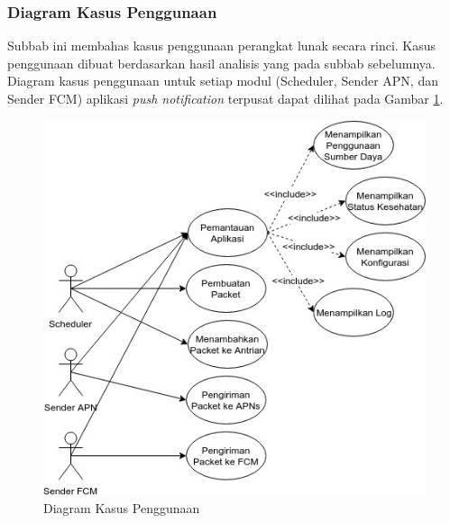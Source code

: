 \subsubsection{Diagram Kasus Penggunaan}
\par Subbab ini membahas kasus penggunaan perangkat lunak secara rinci. Kasus penggunaan dibuat berdasarkan hasil analisis yang pada subbab sebelumnya. Diagram kasus penggunaan untuk setiap modul (Scheduler, Sender APN, dan Sender FCM) aplikasi \textit{push notification} terpusat dapat dilihat pada Gambar \ref{diagram_kasus_penggunaan}.
\begin{figure}[H]
	\caption{Diagram Kasus Penggunaan} \label{diagram_kasus_penggunaan}
    \includegraphics[width=1\textwidth]{bab3/figures/diagram_kasus_penggunaan.jpg}
\end{figure}

\newcommand\tableUcDesc[8] {
\begin{longtable}{|p{2.5cm}|p{6.5cm}|}
	\caption{Kasus Penggunaan #3} \label{#1} \\ \hline
    \textbf{Komponen} & \textbf{Deskripsi} \\ \hline
    Kode & #2 \\ \hline
    Nama & #3 \\ \hline
    Aktor & #4 \\ \hline
    Kondisi Awal & #5 \\ \hline
    Kondisi Akhir & #6 \\ \hline
    Alur Normal & #7 \\ \hline
    Alur Alternatif & #8 \\ \hline
\end{longtable}
}

